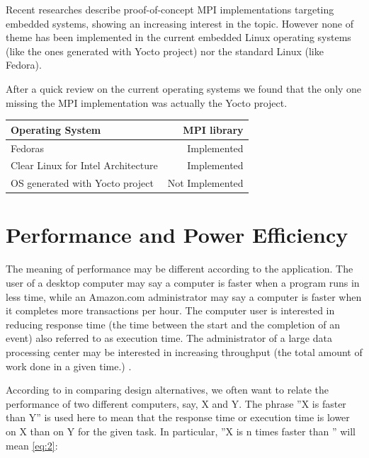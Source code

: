 Recent researches \cite{Saldana} \cite{Gallego} \cite{McMahon} describe
proof-of-concept MPI implementations targeting embedded systems, showing an
increasing interest in the topic. However none of theme has been implemented in
the current embedded Linux operating systems (like the ones generated with
Yocto project\cite{yocto-project}) nor the standard Linux (like
Fedora\cite{fedora}).

After a quick review on the current operating systems we found that the only
one missing the MPI implementation was actually the Yocto project.


\begin{center}
\begin{tabular}{ | l | r |}
    \hline
    Operating System & MPI library  \\ \hline
    Fedoras & Implemented  \\ \hline
    Clear Linux for Intel Architecture & Implemented  \\ \hline
    OS generated with Yocto project & Not Implemented  \\ \hline
\end{tabular}
\label{tab:4.2}
\end{center}


\section{Performance and Power Efficiency}

\noindent

The meaning of performance may be different according to the application.
The user of a desktop computer may say a computer is faster when a program runs in less
time, while an Amazon.com administrator may say a computer is faster when it
completes more transactions per hour. The computer user is interested in 
reducing response time (the time between the start and the completion of an 
event) \cite{Hennessy} also referred to as execution time. The administrator of a large data 
processing center may be interested in increasing throughput (the total amount 
of work done in a given time.) \cite{Hennessy}. 

According to \cite{Hennessy} in comparing design alternatives, we often want to
relate the performance of two different computers, say, X and Y. The phrase ''X
is faster than Y'' is used here to mean that the response time or execution
time is lower on X than on Y for the given task. In particular, ''X is n times
faster than ''  will mean \ref{eq:2}:


